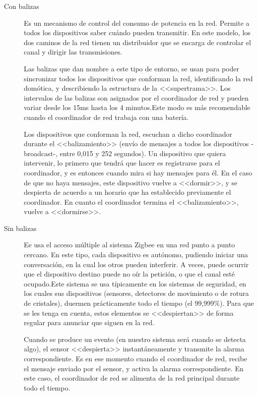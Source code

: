 \begin{description}
\item[Con balizas] Es un mecanismo de control del consumo de potencia en la red. Permite a todos los dispositivos saber cu\'ando pueden transmitir. En este modelo, los dos caminos de la red tienen un distribuidor que se encarga de controlar el canal y dirigir las transmisiones.

 Las balizas que dan nombre a este tipo de entorno, se usan para poder sincronizar todos los dispositivos que conforman la red, identificando la red dom\'otica, y describiendo la estructura de la <<supertrama>>. Los intervalos de las balizas son asignados por el coordinador de red y pueden variar desde los 15ms hasta los 4 minutos.Este modo es m\'as recomendable cuando el coordinador de red trabaja con una bater\'ia.
 
  Los dispositivos que conforman la red, escuchan a dicho coordinador durante el <<balizamiento>> (env\'io de mensajes a todos los dispositivos -broadcast-, entre 0,015 y 252 segundos). Un dispositivo que quiera intervenir, lo primero que tendr\'a que hacer es registrarse para el coordinador, y es entonces cuando mira si hay mensajes para \'el. En el caso de que no haya mensajes, este dispositivo vuelve a <<dormir>>, y se despierta de acuerdo a un horario que ha establecido previamente el coordinador. En cuanto el coordinador termina el <<balizamiento>>, vuelve a <<dormirse>>.
  
\item[Sin balizas] Ee usa el acceso m\'ultiple al sistema Zigbee en una red punto a punto cercano. En este tipo, cada dispositivo es aut\'onomo, pudiendo iniciar una conversaci\'on, en la cual los otros pueden interferir. A veces, puede ocurrir que el dispositivo destino puede no o\'ir la petici\'on, o que el canal est\'e ocupado.Este sistema se usa t\'ipicamente en los sistemas de seguridad, en los cuales sus dispositivos (sensores, detectores de movimiento o de rotura de cristales), duermen pr\'acticamente todo el tiempo (el 99,999\%). Para que se les tenga en cuenta, estos elementos se <<despiertan>> de forma regular para anunciar que siguen en la red. 

Cuando se produce un evento (en nuestro sistema ser\'a cuando se detecta algo), el sensor <<despierta>> instant\'aneamente y transmite la alarma correspondiente. Es en ese momento cuando el coordinador de red, recibe el mensaje enviado por el sensor, y activa la alarma correspondiente. En este caso, el coordinador de red se alimenta de la red principal durante todo el tiempo.
\end{description}

